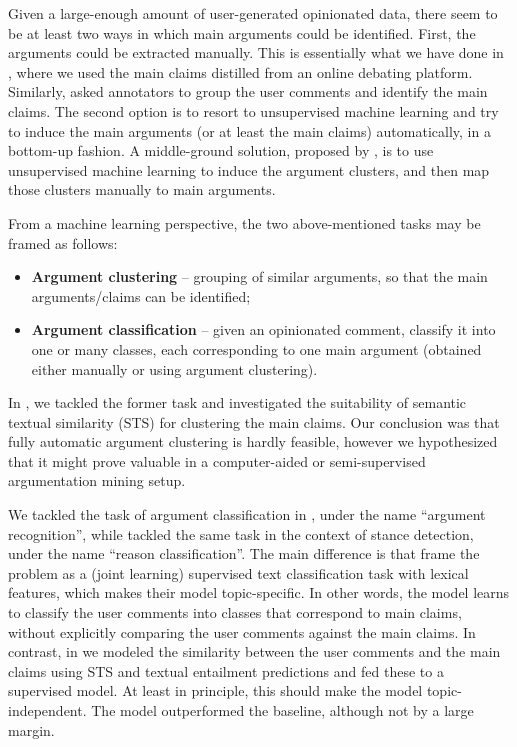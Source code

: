\documentclass[11pt]{article}
\begin{document}
Given a large-enough amount of user-generated opinionated data, there seem to
be at least two ways in which main arguments could be identified. First, the
arguments could be extracted manually. This is essentially what we have done in
\cite{boltuzic2014back}, where we used the main claims distilled from an online
debating platform. Similarly,  asked annotators to group
the user comments and identify the main claims. The second option is to resort
to unsupervised machine learning and try to induce the main arguments (or at
least the main claims) automatically, in a bottom-up fashion. A middle-ground
solution, proposed by , is to use
unsupervised machine learning to induce the argument clusters, and then map
those clusters manually to main arguments.

From a machine learning perspective, the two above-mentioned tasks may be framed as follows:

\begin{itemize}
\item \textbf{Argument clustering} -- grouping of similar arguments, so that the main arguments/claims can be identified;
\item \textbf{Argument classification} -- given an opinionated comment, classify it into one or many classes, each corresponding to one main argument (obtained either manually or using argument clustering).
\end{itemize}

In \cite{boltuzic2015identifying}, we tackled the former task and 
investigated the suitability of semantic textual similarity (STS) \cite{agirre2012semeval} for clustering the
main claims. Our conclusion was that fully automatic argument clustering is
hardly feasible, however we hypothesized that it might prove valuable in a
computer-aided or semi-supervised argumentation mining setup.

We tackled the task of argument classification in \cite{boltuzic2014back},
under the name ``argument recognition'', while  tackled
the same task in the context of stance detection, under the name ``reason
classification''.  The main difference is that  frame the
problem as a (joint learning) supervised text classification task with lexical
features, which makes their model topic-specific. In other words, the model
learns to classify the user comments into classes that correspond to main
claims, without explicitly comparing the user comments against the main claims.
In contrast, in \cite{boltuzic2014back} we modeled the similarity between the
user comments and the main claims using STS and textual
entailment predictions and fed these to a supervised model. At least in
principle, this should make the model topic-independent. The model outperformed
the baseline, although not by a large margin.
\end{document}
